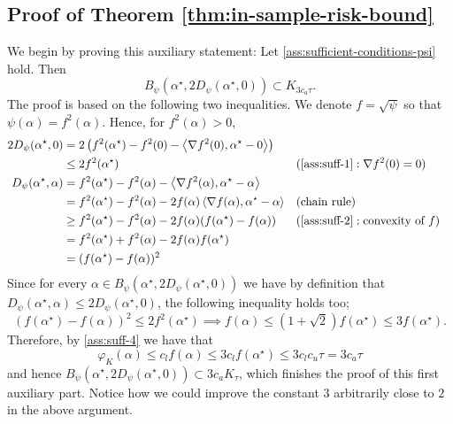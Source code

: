 \documentclass[a4paper]{article}
\newcommand{\pr}[1]{\left(#1\right)}
\newcommand{\inner}[2]{\left\langle #1,#2\right\rangle}
\newcommand{\alphastar}{\alpha^\star}
\newcommand{\Kt}[0]{K_\tau}
\theoremstyle{thmstyle}
\theoremstyle{defstyle}
\theoremstyle{remark}
\begin{document}
\subsection{Proof of Theorem \ref{thm:in-sample-risk-bound}}
\label{subsec:proof-in-sample-risk-bound}
We begin by proving this auxiliary statement:
Let \cref{ass:sufficient-conditions-psi} hold. Then
\begin{equation}
\label{eq:inclusion-2}
    B_\psi(\alphastar,2 D_\psi(\alphastar,0))\subset K_{3c_a\tau}.
\end{equation}
The proof is based on the following two inequalities. We denote $f=\sqrt{\psi}$ so that $\psi(\alpha)=f^2(\alpha)$. Hence, for $f^2(\alpha)>0$,
\begin{align*}
    2D_\psi(\alphastar,0)&=2\pr{f^2(\alphastar)-f^2(0)-\inner{\nabla f^2(0)}{\alphastar-0}} \\
    &\leq 2f^2(\alphastar) &&(\ref{ass:suff-1}: \nabla f^2(0)=0)\\
    D_\psi(\alphastar,\alpha)&= f^2(\alphastar)-f^2(\alpha)-\inner{\nabla f^2(\alpha)}{\alphastar-\alpha} \\
    &=f^2(\alphastar)-f^2(\alpha)-2f(\alpha)\inner{\nabla f(\alpha)}{\alphastar-\alpha} && (\text{chain rule}) \\
    &\geq f^2(\alphastar)-f^2(\alpha)-2f(\alpha)(f(\alphastar)-f(\alpha)) && (\ref{ass:suff-2}: \text{convexity of $f$}) \\
    &=f^2(\alphastar)+f^2(\alpha)-2f(\alpha)f(\alphastar) \\
    &= (f(\alphastar)-f(\alpha))^2
\end{align*}
Since for every $\alpha\in B_\psi(\alphastar,2D_\psi(\alphastar,0))$ we have by definition that $D_\psi(\alphastar,\alpha)\leq 2D_\psi(\alphastar,0)$, the following inequality holds too;
\begin{equation*}
    (f(\alphastar)-f(\alpha))^2 \leq 2f^2(\alphastar) \implies f(\alpha)\leq (1+\sqrt{2})f(\alphastar) \leq 3f(\alphastar).
\end{equation*}
Therefore, by \ref{ass:suff-4} we have that
\begin{equation*}
    \varphi_K(\alpha) \leq c_lf(\alpha) \leq 3c_lf(\alphastar) \leq 3c_lc_u\tau = 3c_a\tau
\end{equation*}
and hence $B_\psi(\alphastar,2D_\psi(\alphastar,0))\subset 3c_a\Kt$, which finishes the proof of this first auxiliary part. Notice how we could improve the constant $3$ arbitrarily close to $2$ in the above argument.
\end{document}
